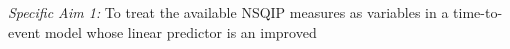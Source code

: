 \emph{Specific Aim 1:} To treat the available NSQIP measures as variables in a time-to-event model whose linear predictor is an improved 